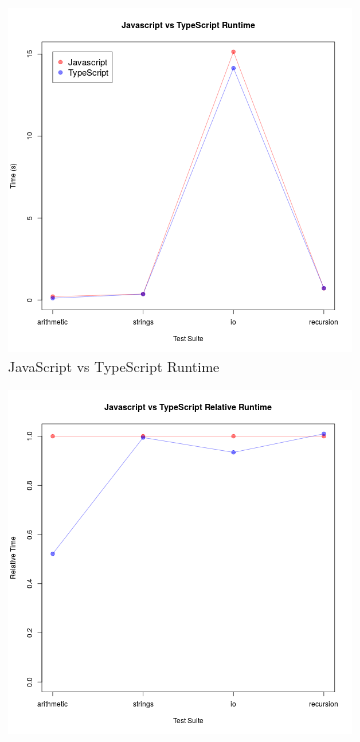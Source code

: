 \begin{figure}[H]
\centering
\begin{subfigure}{.5\textwidth}
  \centering
  \includegraphics[width=\linewidth]{../src/Javascript_typed_vs_untyped.png}
  \caption{JavaScript vs TypeScript Runtime}
  \label{fig:javascriptTypescriptRaw}
\end{subfigure}%
\begin{subfigure}{.5\textwidth}
  \centering
  \includegraphics[width=\linewidth]{../src/Javascript_typed_vs_untyped_relative.png}

\end{subfigure}
\end{figure}
